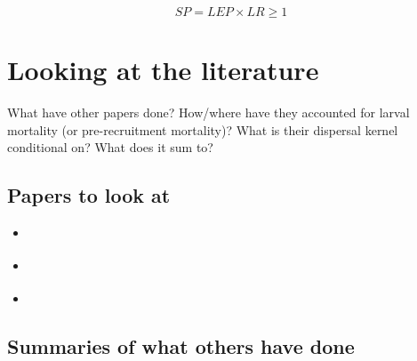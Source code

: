 \documentclass[12pt, oneside]{article}   	%
\begin{document}
\begin{equation}
SP = LEP \times LR \geq 1
\end{equation}









\section*{Looking at the literature}
What have other papers done? How/where have they accounted for larval mortality (or pre-recruitment mortality)? What is their dispersal kernel conditional on? What does it sum to?
\subsection*{Papers to look at}
\begin{itemize}
	\item \cite{johnson2018integrating}
	\item \cite{carson_reproductive_2010}
	\item \cite{salles2016genetic}
\end{itemize}
\subsection*{Summaries of what others have done}




\end{document}
